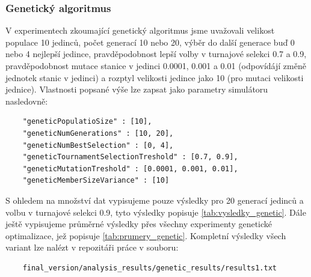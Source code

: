 \subsubsection{Genetický algoritmus}
V experimentech zkoumající genetický algoritmus jsme uvažovali velikost populace 10 jedinců,
počet generací 10 nebo 20, výběr do další generace buď 0 nebo 4 nejlepší jedince, pravděpodobnost
lepší volby v turnajové selekci 0.7 a 0.9, pravděpodobnost mutace stanice v jedinci 0.0001, 0.001 a 
0.01 (odpovídájí změně jednotek stanic v jedinci) a rozptyl velikosti jedince jako 10 
(pro mutaci velikosti jednice). Vlastnosti popsané výše lze zapsat jako parametry simulátoru nasledovně:

\begin{verbatim}
    "geneticPopulatioSize" : [10],
    "geneticNumGenerations" : [10, 20],
    "geneticNumBestSelection" : [0, 4],
    "geneticTournamentSelectionTreshold" : [0.7, 0.9],
    "geneticMutationTreshold" : [0.0001, 0.001, 0.01],
    "geneticMemberSizeVariance" : [10]
\end{verbatim}

S ohledem na množství dat vypisujeme pouze výsledky pro 20 generací jedinců a 
volbu v turnajové selekci 0.9, tyto výsledky popisuje \cref{tab:vysledky_genetic}.
Dále ještě vypisujeme průměrné výsledky přes všechny experimenty genetické
optimalizace, jež popisuje \cref{tab:prumery_genetic}. Kompletní výsledky 
všech variant lze nalézt v repozitáři práce v souboru:

\begin{verbatim}
    final_version/analysis_results/genetic_results/results1.txt
\end{verbatim}


